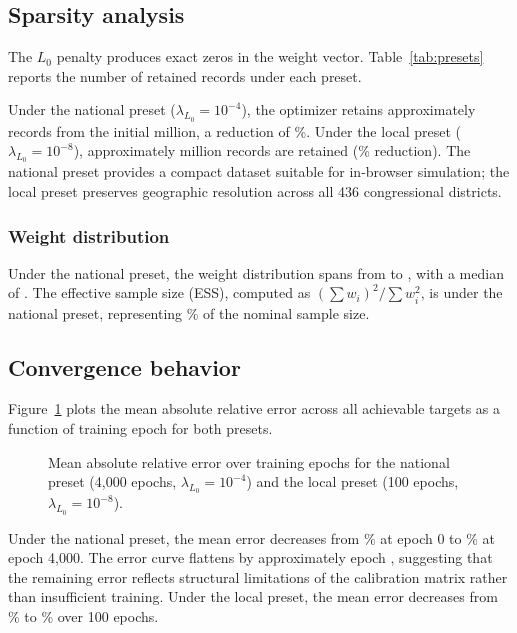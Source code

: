 \subsection{Sparsity analysis}

The $L_0$ penalty produces exact zeros in the weight vector. Table~\ref{tab:presets} reports the number of retained records under each preset.

Under the national preset ($\lambda_{L_0} = 10^{-4}$), the optimizer retains approximately  records from the initial \tbc[total] million, a reduction of \%. Under the local preset ($\lambda_{L_0} = 10^{-8}$), approximately  million records are retained (\% reduction). The national preset provides a compact dataset suitable for in-browser simulation; the local preset preserves geographic resolution across all 436 congressional districts.

\subsubsection{Weight distribution}

Under the national preset, the weight distribution spans from  to , with a median of . The effective sample size (ESS), computed as $(\sum w_i)^2 / \sum w_i^2$, is \tbc[ESS] under the national preset, representing \% of the nominal sample size.

\subsection{Convergence behavior}

Figure~\ref{fig:convergence} plots the mean absolute relative error across all achievable targets as a function of training epoch for both presets.

\begin{figure}[ht]
    \centering
    \caption{Mean absolute relative error over training epochs for the national preset (4,000 epochs, $\lambda_{L_0} = 10^{-4}$) and the local preset (100 epochs, $\lambda_{L_0} = 10^{-8}$).}
    \label{fig:convergence}
\end{figure}

Under the national preset, the mean error decreases from \tbc[initial]\% at epoch 0 to \tbc[final]\% at epoch 4,000. The error curve flattens by approximately epoch , suggesting that the remaining error reflects structural limitations of the calibration matrix rather than insufficient training. Under the local preset, the mean error decreases from \% to \% over 100 epochs.

